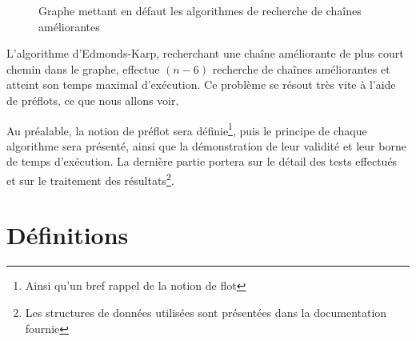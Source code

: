 \begin{figure}[h!]
	\begin{center}
	\end{center}
	\caption{Graphe mettant en défaut les algorithmes de recherche de chaînes améliorantes}
	\label{graphe_defaut}
\end{figure}

L'algorithme d'Edmonds-Karp, recherchant une chaîne améliorante de plus court chemin dans le graphe,
effectue $(n-6)$ recherche de chaînes améliorantes et atteint son temps maximal d'exécution. Ce
problème se résout très vite à l'aide de préflots, ce que nous allons voir.

Au préalable, la notion de préflot sera définie\footnote{Ainsi qu'un bref rappel de la notion de
flot}, puis le principe de chaque algorithme sera présenté, ainsi que la démonstration de leur
validité et leur borne de temps d'exécution. La dernière partie portera sur le détail des tests
effectués et sur le traitement des résultats\footnote{Les structures de données utilisées sont
présentées dans la documentation fournie}.

\section{Définitions}

